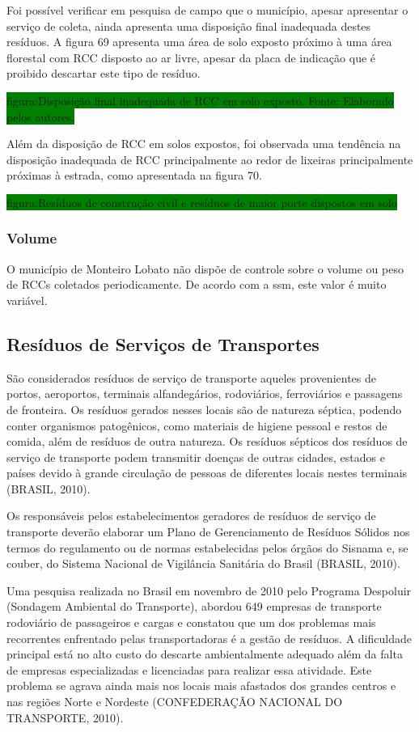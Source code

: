	Foi possível verificar em pesquisa de campo que o município, apesar apresentar o serviço de coleta, ainda apresenta uma disposição final inadequada destes resíduos. A figura 69 apresenta uma área de solo exposto próximo à uma área florestal com RCC disposto ao ar livre, apesar da placa de indicação que é proibido descartar este tipo de resíduo.
	
	\colorbox{green}{figura:Disposição final inadequada de RCC em solo exposto.  Fonte: Elaborado pelos autores.}
	
	Além da disposição de RCC em solos expostos, foi observada uma tendência na disposição inadequada de RCC principalmente ao redor de lixeiras principalmente próximas à estrada, como apresentada na figura 70.
	
	\colorbox{green}{figura:Resíduos de construção civil e resíduos de maior porte dispostos em solo}
	
	\subsubsection{Volume}
	O município de Monteiro Lobato não dispõe de controle sobre o volume ou peso de RCCs coletados periodicamente. De acordo com a \gls{ssm}, este valor é muito variável.
	
	
	\subsection{Resíduos de Serviços de Transportes}
	
	São considerados resíduos de serviço de transporte aqueles provenientes de portos, aeroportos, terminais alfandegários, rodoviários, ferroviários e passagens de fronteira. Os resíduos gerados nesses locais são de natureza séptica, podendo conter organismos patogênicos, como materiais de higiene pessoal e restos de comida, além de resíduos de outra natureza. Os resíduos sépticos dos resíduos de serviço de transporte podem transmitir doenças de outras cidades, estados e países devido à grande circulação de pessoas de diferentes locais nestes terminais (BRASIL, 2010).
	
	Os responsáveis pelos estabelecimentos geradores de resíduos de serviço de transporte deverão elaborar um Plano de Gerenciamento de Resíduos Sólidos nos termos do regulamento ou de normas estabelecidas pelos órgãos do Sisnama e, se couber, do Sistema Nacional de Vigilância Sanitária do Brasil (BRASIL, 2010).
	
	Uma pesquisa realizada no Brasil em novembro de 2010 pelo Programa Despoluir (Sondagem Ambiental do Transporte), abordou 649 empresas de transporte rodoviário de passageiros e cargas e constatou que um dos problemas mais recorrentes enfrentado pelas transportadoras é a gestão de resíduos. A dificuldade principal está no alto custo do descarte ambientalmente adequado além da falta de empresas especializadas e licenciadas para realizar essa atividade. Este problema se agrava ainda mais nos locais mais afastados dos grandes centros e nas regiões Norte e Nordeste (CONFEDERAÇÃO NACIONAL DO TRANSPORTE, 2010).
	
